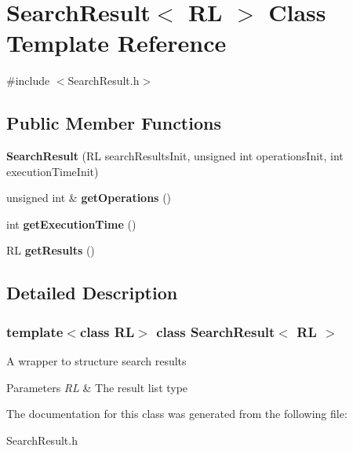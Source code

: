 \hypertarget{class_search_result}{}\section{Search\+Result$<$ RL $>$ Class Template Reference}
\label{class_search_result}


{\ttfamily \#include $<$Search\+Result.\+h$>$}

\subsection*{Public Member Functions}
\begin{DoxyCompactItemize}
\item 
\mbox{\label{class_search_result_af72873c61b4cafe76adc99dca7651249}} 
{\bfseries Search\+Result} (RL search\+Results\+Init, unsigned int operations\+Init, int execution\+Time\+Init)
\item 
\mbox{\label{class_search_result_acdd4aa74e08d43d1d5be60408e4f884c}} 
unsigned int \& {\bfseries get\+Operations} ()
\item 
\mbox{\label{class_search_result_a8a0267d85a4a0db53378cc3645dff916}} 
int {\bfseries get\+Execution\+Time} ()
\item 
\mbox{\label{class_search_result_ae826a688d5405d48bfde94ff80b04845}} 
RL {\bfseries get\+Results} ()
\end{DoxyCompactItemize}


\subsection{Detailed Description}
\subsubsection*{template$<$class RL$>$\newline
class Search\+Result$<$ R\+L $>$}

A wrapper to structure search results 
\begin{DoxyParams}{Parameters}
{\em RL} & The result list type \\
\hline
\end{DoxyParams}


The documentation for this class was generated from the following file\+:\begin{DoxyCompactItemize}
\item 
Search\+Result.\+h\end{DoxyCompactItemize}
